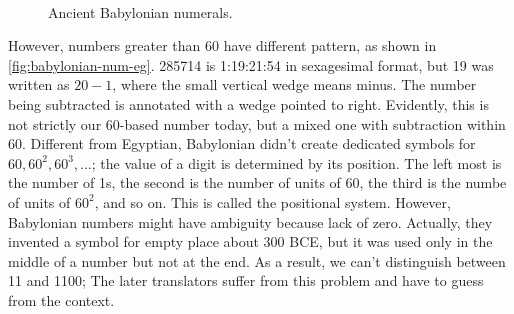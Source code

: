 \documentclass[b5paper]{article}
\begin{document}
\begin{figure}[htbp]
 \centering
  \\
 \caption{Ancient Babylonian numerals.}
\end{figure}

However, numbers greater than 60 have different pattern, as shown in \cref{fig:babylonian-num-eg}. 285714 is 1:19:21:54 in sexagesimal format, but 19 was written as $20 - 1$, where the small vertical wedge means minus. The number being subtracted is annotated with a wedge pointed to right. Evidently, this is not strictly our 60-based number today, but a mixed one with subtraction within 60. Different from Egyptian, Babylonian didn't create dedicated symbols for $60, 60^2, 60^3, \dotsc$; the value of a digit is determined by its position. The left most is the number of 1s, the second is the number of units of 60, the third is the numbe of units of $60^2$, and so on. This is called the positional system. However, Babylonian numbers might have ambiguity because lack of zero. Actually, they invented a symbol for empty place about 300 BCE, but it was used only in the middle of a number but not at the end. As a result, we can't distinguish between 11 and 1100; The later translators suffer from this problem and have to guess from the context.
\end{document}
